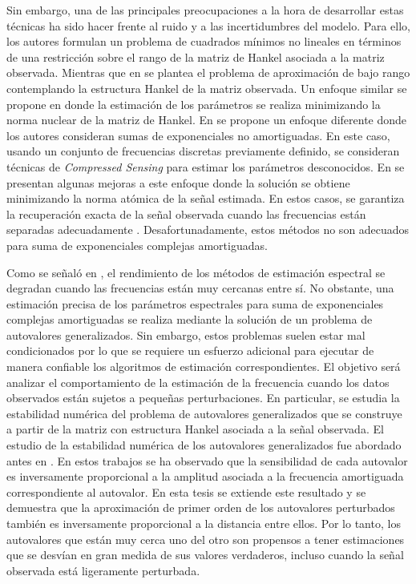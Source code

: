 Sin embargo, una de las principales preocupaciones a la hora de desarrollar estas técnicas ha sido hacer frente al ruido y a las incertidumbres del modelo. Para ello, \cite{Andersson2014} los autores formulan un problema de cuadrados mínimos no lineales en términos de una restricción sobre el rango de la matriz de Hankel asociada a la matriz observada. Mientras que en \cite{Grussler2018} se plantea el problema de aproximación de bajo rango contemplando la estructura Hankel de la matriz observada. Un enfoque similar se propone en \cite{Ying2018} donde la estimación de los parámetros se realiza minimizando la norma nuclear de la matriz de Hankel. En \cite{Yang2018} se propone un enfoque diferente donde los autores consideran sumas de exponenciales no amortiguadas. En este caso, usando un conjunto de frecuencias discretas previamente definido, se consideran técnicas de \emph{Compressed Sensing} \cite{Donoho2006} para estimar los parámetros desconocidos. En \cite{Yang2015,Yang2016} se presentan algunas mejoras a este enfoque donde la solución se obtiene minimizando la norma atómica de la señal estimada. En estos casos, se garantiza la recuperación exacta de la señal observada cuando las frecuencias están separadas adecuadamente \cite{Candes2014}. Desafortunadamente, estos métodos no son adecuados para suma de exponenciales complejas amortiguadas.

Como se señaló en \cite{Halder1997}, el rendimiento de los métodos de estimación espectral se degradan cuando las frecuencias están muy cercanas entre sí. No obstante, una estimación precisa de los parámetros espectrales para suma de exponenciales complejas amortiguadas se realiza mediante la solución de un problema de autovalores generalizados. Sin embargo, estos problemas suelen estar mal condicionados por lo que se requiere un esfuerzo adicional para ejecutar de manera confiable los algoritmos de estimación correspondientes. El objetivo será analizar el comportamiento de la estimación de la frecuencia cuando los datos observados están sujetos a pequeñas perturbaciones. En particular, se estudia la estabilidad numérica del problema de autovalores generalizados que se construye a partir de la matriz con estructura Hankel asociada a la señal observada. El estudio de la estabilidad numérica  de los autovalores generalizados fue abordado antes en \cite{Golub1999, Beckermann2007}. En estos trabajos se ha observado que la sensibilidad de cada autovalor es inversamente proporcional a la amplitud asociada a la frecuencia amortiguada correspondiente al autovalor. En esta tesis se extiende este resultado y se demuestra que la aproximación de primer orden de los autovalores perturbados también es inversamente proporcional a la distancia entre ellos. Por lo tanto, los autovalores que están muy cerca uno del otro son propensos a tener estimaciones que se desvían en gran medida de sus valores verdaderos, incluso cuando la señal observada está ligeramente perturbada.

